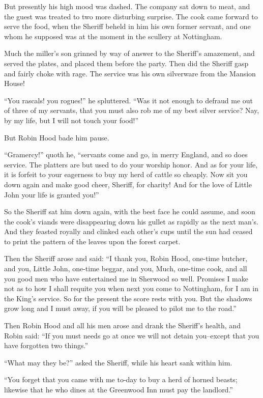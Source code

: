 But presently his high mood was dashed. The company sat down to meat,
and the guest was treated to two more disturbing surprise. The cook came
forward to serve the food, when the Sheriff beheld in him his own former
servant, and one whom he supposed was at the moment in the scullery at
Nottingham.

Much the miller's son grinned by way of answer to the Sheriff's
amazement, and served the plates, and placed them before the party. Then
did the Sheriff gasp and fairly choke with rage. The service was his own
silverware from the Mansion House!

``You rascals! you rogues!'' he spluttered. ``Was it not enough to
defraud me out of three of my servants, that you must also rob me of my
best silver service? Nay, by my life, but I will not touch your food!''

But Robin Hood bade him pause.

``Gramercy!'' quoth he, ``servants come and go, in merry England, and so
does service. The platters are but used to do your worship honor. And as
for your life, it is forfeit to your eagerness to buy my herd of cattle
so cheaply. Now sit you down again and make good cheer, Sheriff, for
charity! And for the love of Little John your life is granted you!''

So the Sheriff sat him down again, with the best face he could assume,
and soon the cook's viands were disappearing down his gullet as rapidly
as the next man's. And they feasted royally and clinked each other's
cups until the sun had ceased to print the pattern of the leaves upon
the forest carpet.

Then the Sheriff arose and said: ``I thank you, Robin Hood, one-time
butcher, and you, Little John, one-time beggar, and you, Much, one-time
cook, and all you good men who have entertained me in Sherwood so well.
Promises I make not as to how I shall requite you when next you come to
Nottingham, for I am in the King's service. So for the present the score
rests with you. But the shadows grow long and I must away, if you will
be pleased to pilot me to the road.''

Then Robin Hood and all his men arose and drank the Sheriff's health,
and Robin said: ``If you must needs go at once we will not detain
you--except that you have forgotten two things.''

``What may they be?'' asked the Sheriff, while his heart sank within
him.

``You forget that you came with me to-day to buy a herd of horned
beasts; likewise that he who dines at the Greenwood Inn must pay the
landlord.''


